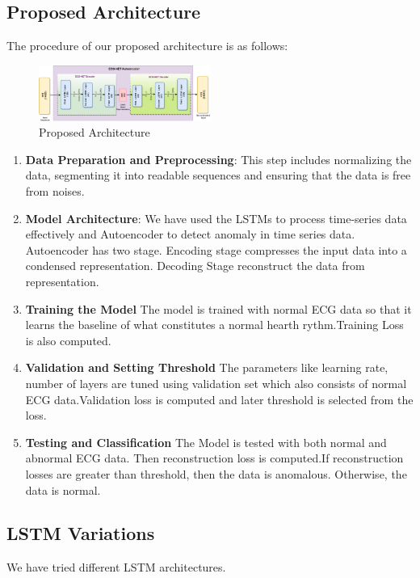 \documentclass[nonacm,sigconf]{acmart}
\begin{document}
\subsection{Proposed Architecture}
The procedure of our proposed architecture is as follows:
\begin{figure}[h]
  \centering
  \includegraphics[width=0.5\textwidth]{LSTMs/ecgnet.png}
  \caption{Proposed Architecture}
\end{figure}
\begin{enumerate}
    \item \textbf{Data Preparation and Preprocessing}: This step includes normalizing the data, segmenting it into readable sequences and ensuring that the data is free from noises.

    \item \textbf{Model Architecture}: We have used the LSTMs to process time-series data effectively and Autoencoder to detect anomaly in time series data. Autoencoder has two stage. Encoding stage compresses the input data into a condensed representation. Decoding Stage reconstruct the data from representation.

    \item \textbf{Training the Model} 
    The model is trained with normal ECG data so that it learns the baseline of what constitutes a normal hearth rythm.Training Loss is also computed.

    \item \textbf{Validation and Setting Threshold}
    The parameters like learning rate, number of layers are tuned using validation set which also consists of normal ECG data.Validation loss is computed and later threshold is selected from the loss.

    \item {\textbf{Testing and Classification}}
    The Model is tested with both normal and abnormal ECG data. Then reconstruction loss is computed.If reconstruction losses are greater than threshold, then the data is anomalous. Otherwise, the data is normal.
\end{enumerate}

\subsection{LSTM Variations}
We have tried different LSTM architectures.
\end{document}

